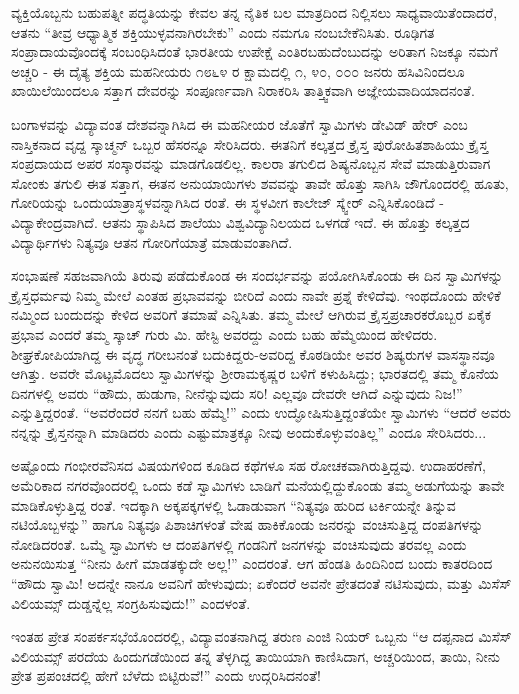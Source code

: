 ವ್ಯಕ್ತಿಯೊಬ್ಬನು ಬಹುಪತ್ನೀ ಪದ್ಧತಿಯನ್ನು ಕೇವಲ ತನ್ನ ನೈತಿಕ ಬಲ ಮಾತ್ರದಿಂದ ನಿಲ್ಲಿಸಲು ಸಾಧ್ಯವಾಯಿತೆಂದಾದರೆ, ಆತನು “ತೀವ್ರ ಆಧ್ಯಾತ್ಮಿಕ ಶಕ್ತಿಯುಳ್ಳವನಾಗಿರಬೇಕು” ಎಂದು ನಮಗೂ ನಂಬಬೇಕೆನಿಸಿತು. ರೂಢಿಗತ ಸಂಪ್ರಾದಾಯವೊಂದಕ್ಕೆ ಸಂಬಂಧಿಸಿದಂತೆ ಭಾರತೀಯ ಉಪೇಕ್ಷೆ ಎಂತಿರಬಹುದೆಂಬುದನ್ನು ಅರಿತಾಗ ನಿಜಕ್ಕೂ ನಮಗೆ ಅಚ್ಚರಿ - ಈ ದೈತ್ಯ ಶಕ್ತಿಯ ಮಹನೀಯರು ೧೮೬೪ ರ ಕ್ಷಾಮದಲ್ಲಿ ೧, ೪೦, ೦೦೦ ಜನರು ಹಸಿವಿನಿಂದಲೂ ಖಾಯಿಲೆಯಿಂದಲೂ ಸತ್ತಾಗ ದೇವರನ್ನು ಸಂಪೂರ್ಣವಾಗಿ ನಿರಾಕರಿಸಿ ತಾತ್ತ್ವಿಕವಾಗಿ ಅಜ್ಞೇಯವಾದಿಯಾದನಂತೆ.

ಬಂಗಾಳವನ್ನು ವಿದ್ಯಾವಂತ ದೇಶವನ್ನಾಗಿಸಿದ ಈ ಮಹನೀಯರ ಜೊತೆಗೆ ಸ್ವಾಮಿಗಳು ಡೇವಿಡ್ ಹೇರ್ ಎಂಬ ನಾಸ್ತಿಕನಾದ ವೃದ್ದ ಸ್ಕಾಚ್ಮನ್ ಒಬ್ಬರ ಹೆಸರನ್ನೂ ಸೇರಿಸಿದರು. ಈತನಿಗೆ ಕಲ್ಕತ್ತದ ಕ್ರೈಸ್ತ ಪುರೋಹಿತಶಾಹಿಯು ಕ್ರೈಸ್ತ ಸಂಪ್ರದಾಯದ ಅಪರ ಸಂಸ್ಕಾರವನ್ನು ಮಾಡಗೊಡಲಿಲ್ಲ. ಕಾಲರಾ ತಗುಲಿದ ಶಿಷ್ಯನೊಬ್ಬನ ಸೇವೆ ಮಾಡುತ್ತಿರುವಾಗ ಸೋಂಕು ತಗುಲಿ ಈತ ಸತ್ತಾಗ, ಈತನ ಅನುಯಾಯಿಗಳು ಶವವನ್ನು ತಾವೇ ಹೊತ್ತು ಸಾಗಿಸಿ ಜೌಗೊಂದರಲ್ಲಿ ಹೂತು, ಗೋರಿಯನ್ನು ಒಂದುಯಾತ್ರಾಸ್ಥಳವನ್ನಾಗಿಸಿದ ರಂತೆ. ಈ ಸ್ಥಳವೀಗ ಕಾಲೇಜ್ ಸ್ಕ್ವೇರ್ ಎನ್ನಿಸಿಕೊಂಡಿದೆ - ವಿದ್ಯಾಕೇಂದ್ರವಾಗಿದೆ. ಆತನು ಸ್ಥಾಪಿಸಿದ ಶಾಲೆಯು ವಿಶ್ವವಿದ್ಯಾನಿಲಯದ ಒಳಗಡೆ ಇದೆ. ಈ ಹೊತ್ತು ಕಲ್ಕತ್ತದ ವಿದ್ಯಾರ್ಥಿಗಳು ನಿತ್ಯವೂ ಆತನ ಗೋರಿಗೆಯಾತ್ರೆ ಮಾಡುವಂತಾಗಿದೆ.

ಸಂಭಾಷಣೆ ಸಹಜವಾಗಿಯೆ ತಿರುವು ಪಡೆದುಕೊಂಡ ಈ ಸಂದರ್ಭವನ್ನು ಪಯೋಗಿಸಿಕೊಂಡು ಈ ದಿನ ಸ್ವಾಮಿಗಳನ್ನು ಕ್ರೈಸ್ತಧರ್ಮವು ನಿಮ್ಮ ಮೇಲೆ ಎಂತಹ ಪ್ರಭಾವವನ್ನು ಬೀರಿದೆ ಎಂದು ನಾವೇ ಪ್ರಶ್ನೆ ಕೇಳಿದೆವು. ಇಂಥದೊಂದು ಹೇಳಿಕೆ ನಮ್ಮಿಂದ ಬಂದುದನ್ನು ಕೇಳಿದ ಅವರಿಗೆ ತಮಾಷೆ ಎನ್ನಿಸಿತು. ತಮ್ಮ ಮೇಲೆ ಆಗಿರುವ ಕ್ರೈಸ್ತಪ್ರಚಾರಕರೊಬ್ಬರ ಏಕೈಕ ಪ್ರಭಾವ ಎಂದರೆ ತಮ್ಮ ಸ್ಕಾಚ್ ಗುರು ಮಿ. ಹೇಸ್ಟಿ ಅವರದ್ದು ಎಂದು ಬಹು ಹೆಮ್ಮೆಯಿಂದ ಹೇಳಿದರು. ಶೀಘ್ರಕೋಪಿಯಾಗಿದ್ದ ಈ ವೃದ್ಧ ಗರೀಬನಂತೆ ಬದುಕಿದ್ದರು-ಅವರಿದ್ದ ಕೊಠಡಿಯೇ ಅವರ ಶಿಷ್ಯರುಗಳ ವಾಸಸ್ಥಾನವೂ ಆಗಿತ್ತು. ಅವರೇ ಮೊಟ್ಟಮೊದಲು ಸ್ವಾಮಿಗಳನ್ನು ಶ‍್ರೀರಾಮಕೃಷ್ಣರ ಬಳಿಗೆ ಕಳುಹಿಸಿದ್ದು; ಭಾರತದಲ್ಲಿ ತಮ್ಮ ಕೊನೆಯ ದಿನಗಳಲ್ಲಿ ಅವರು “ಹೌದು, ಹುಡುಗಾ, ನೀನೆನ್ನುವುದು ಸರಿ! ಎಲ್ಲವೂ ದೇವರೇ ಆಗಿದೆ ಎನ್ನುವುದು ನಿಜ!” ಎನ್ನುತ್ತಿದ್ದರಂತೆ. “ಅವರೆಂದರೆ ನನಗೆ ಬಹು ಹೆಮ್ಮೆ!” ಎಂದು ಉದ್ಘೋಷಿಸುತ್ತಿದ್ದಂತೆಯೇ ಸ್ವಾಮಿಗಳು “ಆದರೆ ಅವರು ನನ್ನನ್ನು ಕ್ರೈಸ್ತನನ್ನಾಗಿ ಮಾಡಿದರು ಎಂದು ಎಷ್ಟುಮಾತ್ರಕ್ಕೂ ನೀವು ಅಂದುಕೊಳ್ಳುವಂತಿಲ್ಲ” ಎಂದೂ ಸೇರಿಸಿದರು...

ಅಷ್ಟೊಂದು ಗಂಭೀರವೆನಿಸದ ವಿಷಯಗಳಿಂದ ಕೂಡಿದ ಕಥೆಗಳೂ ಸಹ ರೋಚಕವಾಗಿರುತ್ತಿದ್ದವು. ಉದಾಹರಣೆಗೆ, ಅಮೆರಿಕಾದ ನಗರವೊಂದರಲ್ಲಿ ಒಂದು ಕಡೆ ಸ್ವಾಮಿಗಳು ಬಾಡಿಗೆ ಮನೆಯಲ್ಲಿದ್ದುಕೊಂಡು ತಮ್ಮ ಅಡುಗೆಯನ್ನು ತಾವೇ ಮಾಡಿಕೊಳ್ಳುತ್ತಿದ್ದ ರಂತೆ. ಇದಕ್ಕಾಗಿ ಅಕ್ಕಪಕ್ಕಗಳಲ್ಲಿ ಓಡಾಡುವಾಗ “ನಿತ್ಯವೂ ಹುರಿದ ಟರ್ಕಿಯನ್ನೇ ತಿನ್ನುವ ನಟಿಯೊಬ್ಬಳನ್ನು” ಹಾಗೂ ನಿತ್ಯವೂ ಪಿಶಾಚಿಗಳಂತೆ ವೇಷ ಹಾಕಿಕೊಂಡು ಜನರನ್ನು ವಂಚಿಸುತ್ತಿದ್ದ ದಂಪತಿಗಳನ್ನು ನೋಡಿದರಂತೆ. ಒಮ್ಮೆ ಸ್ವಾಮಿಗಳು ಆ ದಂಪತಿಗಳಲ್ಲಿ ಗಂಡನಿಗೆ ಜನಗಳನ್ನು ವಂಚಿಸುವುದು ತರವಲ್ಲ ಎಂದು ಅನುನಯಿಸುತ್ತ “ನೀನು ಹೀಗೆ ಮಾಡತಕ್ಕುದೇ ಅಲ್ಲ!” ಎಂದರಂತೆ. ಆಗ ಹೆಂಡತಿ ಹಿಂದಿನಿಂದ ಬಂದು ಕಾತರದಿಂದ “ಹೌದು ಸ್ವಾಮಿ! ಅದನ್ನೇ ನಾನೂ ಅವನಿಗೆ ಹೇಳುವುದು; ಏಕೆಂದರೆ ಅವನೇ ಪ್ರೇತದಂತೆ ನಟಿಸುವುದು, ಮತ್ತು ಮಿಸೆಸ್ ವಿಲಿಯಮ್ಸ್ ದುಡ್ಡನ್ನೆಲ್ಲ ಸಂಗ್ರಹಿಸುವುದು!” ಎಂದಳಂತೆ.

ಇಂತಹ ಪ್ರೇತ ಸಂಪರ್ಕಸಭೆಯೊಂದರಲ್ಲಿ, ವಿದ್ಯಾವಂತನಾಗಿದ್ದ ತರುಣ ಎಂಜಿ ನಿಯರ್ ಒಬ್ಬನು “ಆ ದಪ್ಪನಾದ ಮಿಸೆಸ್ ವಿಲಿಯಮ್ಸ್ ಪರದೆಯ ಹಿಂದುಗಡೆಯಿಂದ ತನ್ನ ತೆಳ್ಳಗಿದ್ದ ತಾಯಿಯಾಗಿ ಕಾಣಿಸಿದಾಗ, ಅಚ್ಚರಿಯಿಂದ, ತಾಯಿ, ನೀನು ಪ್ರೇತ ಪ್ರಪಂಚದಲ್ಲಿ ಹೇಗೆ ಬೆಳೆದು ಬಿಟ್ಟಿರುವೆ!” ಎಂದು ಉದ್ಗರಿಸಿದನಂತೆ!

